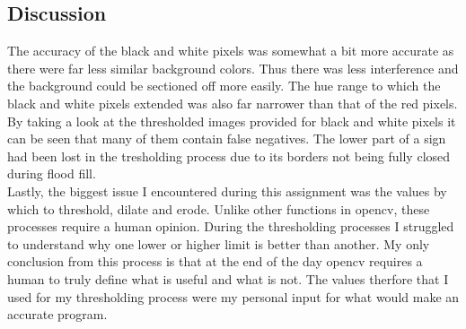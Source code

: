 \documentclass{article}
\begin{document}
\subsection{Discussion}\label{sec:intro}
The accuracy of the black and white pixels was somewhat a bit more accurate as there were far less similar background colors. Thus there was less interference and the background could be sectioned off more easily. The hue range to which the black and white pixels extended was also far narrower than that of the red pixels.\\
By taking a look at the thresholded images provided for black and white pixels it can be seen that many of them contain false negatives. The lower part of a sign had been lost in the tresholding process due to its borders not being fully closed during flood fill. \\
Lastly, the biggest issue I encountered during this assignment was the values by which to threshold, dilate and erode. Unlike other functions in opencv, these processes require a human opinion. During the thresholding processes I struggled to understand why one lower or higher limit is better than another. My only conclusion from this process is that at the end of the day opencv requires a human to truly define what is useful and what is not. The values therfore that I used for my thresholding process were my personal input for what would make an accurate program.\\





\pagebreak
\end{document}
